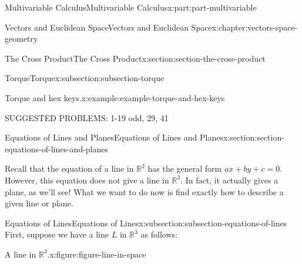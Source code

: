 \documentclass[twoside,10pt,]{tufte-book}
\numberwithin{equation}{part}
\newcommand{\RR}{\mathbb{R}}
\begin{document}
\begin{partptx}{Multivariable Calculus}{}{Multivariable Calculus}{}{}{x:part:part-multivariable}
\begin{chapterptx}{Vectors and Euclidean Space}{}{Vectors and Euclidean Space}{}{}{x:chapter:vectors-space-geometry}
\begin{sectionptx}{The Cross Product}{}{The Cross Product}{}{}{x:section:section-the-cross-product}
\begin{subsectionptx}{Torque}{}{Torque}{}{}{x:subsection:subsection-torque}
\begin{example}{Torque and hex keys.}{x:example:example-torque-and-hex-keys}
\end{example}
\end{subsectionptx}
\begin{conclusion}{}%
SUGGESTED PROBLEMS: 1-19 odd, 29, 41%
\end{conclusion}%
\end{sectionptx}
%
%
\typeout{************************************************}
\typeout{************************************************}
%
\begin{sectionptx}{Equations of Lines and Planes}{}{Equations of Lines and Planes}{}{}{x:section:section-equations-of-lines-and-planes}
\begin{introduction}{}%
Recall that the equation of a line in \(\RR^{2}\) has the general form \(ax+by + c = 0\). However, this equation does not give a line in \(\RR^{3}\). In fact, it actually gives a plane, as we'll see! What we want to do now is find exactly how to describe a given line or plane.%
\end{introduction}%
%
%
\typeout{************************************************}
\typeout{************************************************}
%
\begin{subsectionptx}{Equations of Lines}{}{Equations of Lines}{}{}{x:subsection:subsection-equations-of-lines}
First, suppose we have a line \(L\) in \(\RR^{3}\) as follows:%
\begin{figureptx}{A line in \(\mathbb{R}^{3}\).}{x:figure:figure-line-in-space}{}%
\begin{image}{0.05}{0.9}{0.05}%
\end{image}
\end{figureptx}
\end{subsectionptx}
\end{sectionptx}
\end{chapterptx}
\end{partptx}
\end{document}
